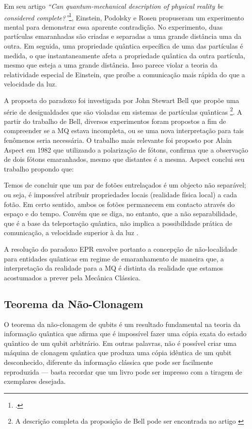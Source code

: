 Em seu artigo \textit{``Can quantum-mechanical description of physical reality be considered complete?''}\footcite{epr}, Einstein, Podolsky e Rosen propuseram um experimento mental para demonstrar essa aparente contradição. No experimento, duas partículas emaranhadas são criadas e separadas a uma grande distância uma da outra. Em seguida, uma propriedade quântica específica de uma das partículas é medida, o que instantaneamente afeta a propriedade quântica da outra partícula, mesmo que esteja a uma grande distância. Isso parece violar a teoria da relatividade especial de Einstein, que proíbe a comunicação mais rápida do que a velocidade da luz.

A proposta do paradoxo foi investigada por John Stewart Bell que propõe uma série de desigualdades que são violadas em sistemas de partículas quânticas \footnote{A descrição completa da proposição de Bell pode ser encontrada no artigo \textcite{Bell}}. A partir do trabalho de Bell, diversos experimentos foram propostos a fim de compreender se a MQ estava incompleta, ou se uma nova interpretação para tais fenômenos seria necessária. O trabalho mais relevante foi proposto por Alain Aspect em 1982 que utilizando a polarização de fótons, confirma que a observação de dois fótons emaranhados, mesmo que distantes é a mesma. Aspect conclui seu trabalho propondo que:
\begin{citacao} Temos de concluir que um par de fotões entrelaçados é um objecto não separável; ou seja, é impossível atribuir propriedades locais (realidade física local) a cada fotão. Em certo sentido, ambos os fotões permanecem em contacto através do espaço e do tempo. Convém que se diga, no entanto, que a não separabilidade, que é a base da teleportação quântica, não implica a possibilidade prática de comunicação, a velocidade superior à da luz \cite{aspect}. 
\end{citacao}
A resolução do paradoxo EPR envolve portanto a concepção de não-localidade para entidades quânticas em regime de emaranhamento de maneira que, a interpretação da realidade para a MQ é distinta da realidade que estamos acostumados a prever pela Mecânica Clássica. 

\subsection{Teorema da Não-Clonagem}\label{sec:naoclonagem}

O teorema da não-clonagem de qubits é um resultado fundamental na teoria da informação quântica que afirma que é impossível fazer uma cópia exata do estado quântico de um qubit arbitrário. Em outras palavras, não é possível criar uma máquina de clonagem quântica que produza uma cópia idêntica de um qubit desconhecido, diferente da informação clássica que pode ser facilmente reproduzida --- basta recordar que um livro pode ser impresso com a tiragem de exemplares desejada.

